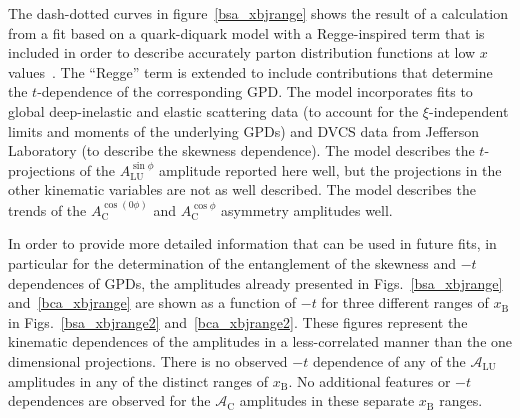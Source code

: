 The dash-dotted curves in figure~\ref{bsa_xbjrange} shows the result of a calculation from a fit based on a quark-diquark model with a Regge-inspired term that is included in order to describe accurately parton distribution functions at low $x$ values~\cite{Liu11}. The ``Regge'' term is extended to include contributions that determine the $t$-dependence of the corresponding GPD. The model incorporates fits to global deep-inelastic and elastic scattering data (to account for the $\xi$-independent limits and moments of the underlying GPDs) and DVCS data from Jefferson Laboratory (to describe the skewness dependence). The model describes the $t$-projections of the $A^{\sin\phi}_{\textrm{LU}}$ amplitude reported here well, but the projections in the other kinematic variables are not as well described. The model describes the trends of the $A_{\textrm{C}}^{\cos(0\phi)}$ and $A_{\textrm{C}}^{\cos\phi}$ asymmetry amplitudes well.

In order to provide more detailed information that can be used in future fits, in particular for the determination of the entanglement of the skewness and $-t$ dependences of GPDs, the amplitudes already presented in Figs.~\ref{bsa_xbjrange} and~\ref{bca_xbjrange} are shown as a function of $-t$ for three different ranges of $x_{\textrm{B}}$ in Figs.~\ref{bsa_xbjrange2} and~\ref{bca_xbjrange2}. These figures represent the kinematic dependences of the amplitudes in a less-correlated manner than the one dimensional projections. There is no observed $-t$ dependence of any of the $\mathcal{A}_{\textrm{LU}}$ amplitudes in any of the distinct ranges of $x_{\textrm{B}}$. No additional features or $-t$ dependences are observed for the $\mathcal{A}_{\textrm{C}}$ amplitudes in these separate $x_{\textrm{B}}$ ranges.

